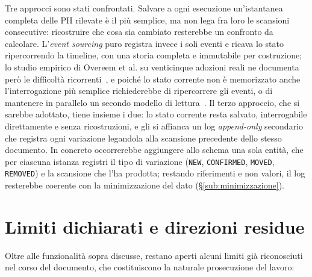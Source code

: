 Tre approcci sono stati confrontati. Salvare a ogni esecuzione un'istantanea completa delle PII rilevate è il più semplice, ma non lega fra loro le scansioni consecutive: ricostruire che cosa sia cambiato resterebbe un confronto da calcolare. L'\textit{event sourcing} puro registra invece i soli eventi e ricava lo stato ripercorrendo la timeline, con una storia completa e immutabile per costruzione; lo studio empirico di Overeem et al. su venticinque adozioni reali ne documenta però le difficoltà ricorrenti~\cite{overeemEmpiricalCharacterizationEvent2021}, e poiché lo stato corrente non è memorizzato anche l'interrogazione più semplice richiederebbe di ripercorrere gli eventi, o di mantenere in parallelo un secondo modello di lettura~\cite{youngCQRSDocuments}. Il terzo approccio, che si sarebbe adottato, tiene insieme i due: lo stato corrente resta salvato, interrogabile direttamente e senza ricostruzioni, e gli si affianca un log \textit{append-only} secondario che registra ogni variazione legandola alla scansione precedente dello stesso documento. In concreto occorrerebbe aggiungere allo schema una sola entità, che per ciascuna istanza registri il tipo di variazione (\texttt{NEW}, \texttt{CONFIRMED}, \texttt{MOVED}, \texttt{REMOVED}) e la scansione che l'ha prodotta; restando riferimenti e non valori, il log resterebbe coerente con la minimizzazione del dato (§\ref{sub:minimizzazione}).

\section{Limiti dichiarati e direzioni residue}
\label{sec:sf-direzioni}

Oltre alle funzionalità sopra discusse, restano aperti alcuni limiti già riconosciuti nel corso del documento, che costituiscono la naturale prosecuzione del lavoro:

